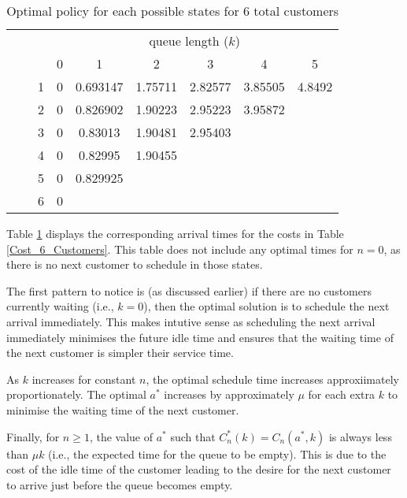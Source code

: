\begin{table}[htb]
	\centering
	\begin{tabular}{c c c || c | c | c | c | c | c}
		& & & \multicolumn{6}{c}{queue length ($k$)} \\
		& & & 0 & 1 & 2 & 3 & 4 & 5 \\ \hline \hline
		\parbox[t]{2mm}{} & \parbox[t]{2mm}{} & 1 & 0 & 0.693147 & 1.75711 & 2.82577 & 3.85505 & 4.8492 \\
		& & 2 & 0 & 0.826902 & 1.90223 & 2.95223 & 3.95872 & \\
		& & 3 & 0 & 0.83013 & 1.90481 & 2.95403 & & \\
		& & 4 & 0 & 0.82995 & 1.90455 & & & \\
		& & 5 & 0 & 0.829925 & & & & \\
		& & 6 & 0 & & & & & \\
	\end{tabular}
	\caption{Optimal policy for each possible states for 6 total customers}
	\label{Policy_6_Customers}
\end{table}

Table \ref{Policy_6_Customers} displays the corresponding arrival times for the costs in Table \ref{Cost_6_Customers}. This table does not include any optimal times for $n = 0$, as there is no next customer to schedule in those states.

The first pattern to notice is (as discussed earlier) if there are no customers currently waiting (i.e., $k = 0$), then the optimal solution is to schedule the next arrival immediately. This makes intutive sense as scheduling the next arrival immediately minimises the future idle time and ensures that the waiting time of the next customer is simpler their service time.

As $k$ increases for constant $n$, the optimal schedule time increases approxiimately proportionately. The optimal $a^{*}$ increases by approximately $\mu$ for each extra $k$ to minimise the waiting time of the next customer.

Finally, for $n \geq 1$, the value of $a^{*}$ such that $C_{n}^{*} (k) = C_{n} (a^{*}, k)$ is always less than $\mu k$ (i.e., the expected time for the queue to be empty). This is due to the cost of the idle time of the customer leading to the desire for the next customer to arrive just before the queue becomes empty.


































